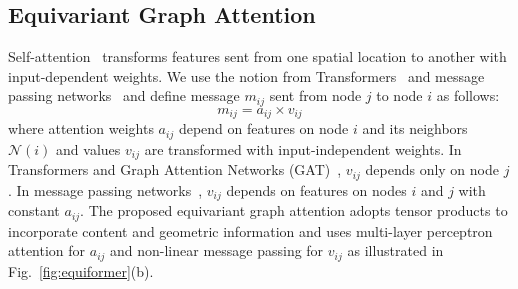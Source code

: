\vspace{-3mm}
\subsection{Equivariant Graph Attention}
\label{subsec:equivariant_graph_attention}
\vspace{-2mm}

Self-attention~\citep{transformer, gat, se3_transformer, transformer_in_vision, graphormer, gatv2} transforms features sent from one spatial location to another with input-dependent weights.
We use the notion from Transformers~\citep{transformer} and message passing networks~\citep{neural_message_passing_quantum_chemistry} and define message $m_{ij}$ sent from node $j$ to node $i$ as follows:
\begin{equation}
m_{ij} = a_{ij} \times v_{ij}
\end{equation}
where attention weights $a_{ij}$ depend on features on node $i$ and its neighbors $\mathcal{N}(i)$ and values $v_{ij}$ are transformed with input-independent weights.
In Transformers and Graph Attention Networks (GAT)~\citep{gat, gatv2}, $v_{ij}$ depends only on node $j$.
In message passing networks~\citep{neural_message_passing_quantum_chemistry}, $v_{ij}$ depends on features on nodes $i$ and $j$ with constant $a_{ij}$.
The proposed equivariant graph attention adopts tensor products to incorporate content and geometric information and uses multi-layer perceptron attention for $a_{ij}$ and non-linear message passing for $v_{ij}$ as illustrated in Fig.~\ref{fig:equiformer}(b).

\vspace{-2mm}
